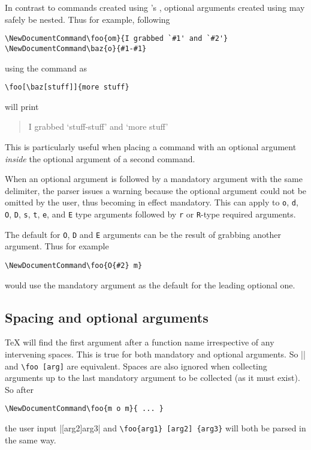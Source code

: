 \documentclass{ltxguide}
\begin{document}
In contrast to commands created using \LaTeXe{}'s , optional
arguments created using  may safely be nested. Thus for
example, following
\begin{verbatim}
\NewDocumentCommand\foo{om}{I grabbed `#1' and `#2'}
\NewDocumentCommand\baz{o}{#1-#1}
\end{verbatim}
using the command as
\begin{verbatim}
\foo[\baz[stuff]]{more stuff}
\end{verbatim}
will print
\begin{quote}
I grabbed `stuff-stuff' and `more stuff'
\end{quote}
This is particularly useful when placing a command with an optional argument
\emph{inside} the optional argument of a second command.

When an optional argument is followed by a mandatory argument with the same
delimiter, the parser issues a warning because the optional argument could not
be omitted by the user, thus becoming in effect mandatory. This can apply to
\texttt{o}, \texttt{d}, \texttt{O}, \texttt{D}, \texttt{s}, \texttt{t},
\texttt{e}, and \texttt{E} type arguments followed by \texttt{r} or
\texttt{R}-type required arguments.

The default for \texttt{O}, \texttt{D} and \texttt{E} arguments can be
the result of grabbing another argument. Thus for example
\begin{verbatim}
\NewDocumentCommand\foo{O{#2} m}
\end{verbatim}
would use the mandatory argument as the default for the leading optional
one.

\subsection{Spacing and optional arguments}
\label{sec:cmd:opt-space}

\TeX{} will find the first argument after a function name irrespective of any
intervening spaces. This is true for both mandatory and optional arguments. So
|\foo[arg]| and \verb*|\foo [arg]| are equivalent. Spaces are also ignored when
collecting arguments up to the last mandatory argument to be collected (as it
must exist). So after
\begin{verbatim}
\NewDocumentCommand\foo{m o m}{ ... }
\end{verbatim}
the user input |[arg2]{arg3}| and \verb*|\foo{arg1} [arg2] {arg3}|
will both be parsed in the same way.
\end{document}
